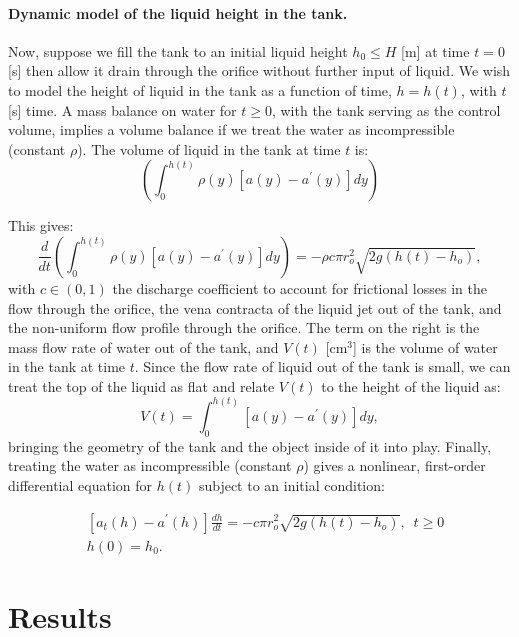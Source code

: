 \documentclass[openacc]{rsproca_new}%
\begin{document}
\paragraph{Dynamic model of the liquid height in the tank.} Now, suppose we fill the tank to an initial liquid height $h_0 \leq H$ [m] at time $t=0$ [s] then allow it drain through the orifice without further input of liquid. We wish to model the height of liquid in the tank as a function of time, $h=h(t)$, with $t$ [s] time. 
A mass balance on water for $t\geq 0$, with the tank serving as the control volume, implies a volume balance if we treat the water as incompressible (constant $\rho$). The volume of liquid in the tank at time $t$ is:
\begin{equation}
	\left ( \int_0^{h(t)} \rho(y) [a(y) - a^\prime(y)]dy \right) 
\end{equation}



This gives:
\begin{equation}
	\frac{d}{dt} \left ( \int_0^{h(t)} \rho(y) [a(y) - a^\prime(y)]dy \right) = - \rho c \pi r_o^2 \sqrt{2 g(h(t)-h_o)},
\end{equation}
with $c\in(0,1)$ the discharge coefficient \cite{lienhard1984velocity,hicks2014determining,wadhwa2021study,teoman2022discharge} to account for frictional losses in the flow through the orifice, the vena contracta of the liquid jet out of the tank, and the non-uniform flow profile through the orifice. The term on the right is the mass flow rate of water out of the tank, and $V(t)$ [cm$^3$] is the volume of water in the tank at time $t$. 
Since the flow rate of liquid out of the tank is small, we can treat the top of the liquid as flat and relate $V(t)$ to the height of the liquid as: 
\begin{equation}
	V(t)=\int_0^{h(t)} [a(y) - a^\prime(y)]dy,
\end{equation}
bringing the geometry of the tank and the object inside of it into play. Finally, treating the water as incompressible (constant $\rho$) gives a nonlinear, first-order differential equation for $h(t)$ subject to an initial condition:

\begin{align}
& [a_t(h)-a^\prime(h)]\frac{dh}{dt}= -c \pi r_o^2 \sqrt{2g (h(t)-h_o)}, \,\,\, t \geq 0 \\
& h(0)=h_0.
\end{align}


\section{Results}
\end{document}
